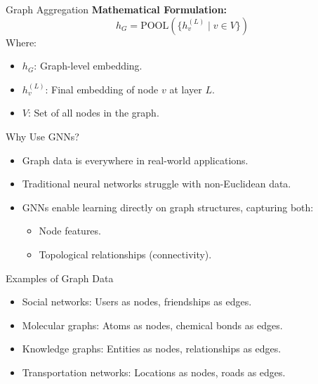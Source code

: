 \documentclass{beamer}
\begin{document}
\begin{frame}{Graph Aggregation}    
    \textbf{Mathematical Formulation:}
    \[
    h_G = \text{POOL}\left(\{h_v^{(L)} \mid v \in V\}\right)
    \]
    Where:
    \begin{itemize}
        \item \( h_G \): Graph-level embedding.
        \item \( h_v^{(L)} \): Final embedding of node \( v \) at layer \( L \).
        \item \( V \): Set of all nodes in the graph.
    \end{itemize}
\end{frame}
\begin{frame}{Why Use GNNs?}
    \begin{itemize}
        \item Graph data is everywhere in real-world applications.
        \item Traditional neural networks struggle with non-Euclidean data.
        \item GNNs enable learning directly on graph structures, capturing both:
        \begin{itemize}
            \item Node features.
            \item Topological relationships (connectivity).
        \end{itemize}
    \end{itemize}
\end{frame}

\begin{frame}{Examples of Graph Data}
    \begin{itemize}
        \item Social networks: Users as nodes, friendships as edges.
        \item Molecular graphs: Atoms as nodes, chemical bonds as edges.
        \item Knowledge graphs: Entities as nodes, relationships as edges.
        \item Transportation networks: Locations as nodes, roads as edges.
    \end{itemize}
\end{frame}


\end{document}
